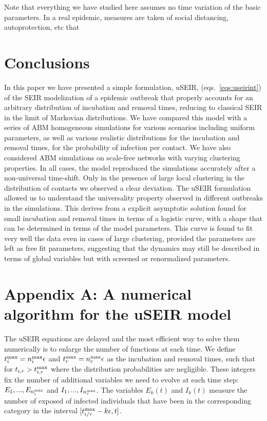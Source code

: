 \documentclass[a4paper,oneside,11pt]{article}
\begin{document}
Note that everything we have studied here assumes no time variation of the basic parameters. In a real epidemic, measures are taken of social distancing, autoprotection, etc that 

\section{Conclusions}
\label{sec:conclu}



In this paper we have presented a simple formulation, uSEIR,  (eqs.~\ref{eqs:useirint}) of the SEIR modelization of a epidemic outbreak that properly accounts for an arbitrary distribution of incubation and removal times, reducing to classical SEIR in the limit of Markovian distributions.  We have compared this model with a series of ABM homogeneous simulations for various scenarios including uniform parameters, as well as various realistic distributions for the incubation and removal times,  for the probability of infection per contact. We have also considered ABM simulations on scale-free networks with varying 
 clustering properties. In all cases, the model reproduced the simulations accurately after a non-universal time-shift. Only in the presence of large local clustering in the distribution of contacts we observed a clear deviation. The uSEIR formulation allowed
us to understand the universality property observed in different outbreaks in the simulations. This derives from a explicit asymptotic solution found for small incubation and removal times in terms of a logistic curve, with a shape that can be determined in terms of the model parameters. This curve is found to fit very well the data  even in cases of large clustering, provided the parameters are left as free fit parameters, suggesting that the dynamics may still be described in terms of global variables but with  screened or renormalized parameters. 

\section*{Appendix A: A numerical algorithm for the uSEIR model}
\label{sec:appendix}

The uSEIR equations are delayed and the most efficient way to solve them numerically is to enlarge the number of functions at each time. We define $t_i^{\rm max}=n_i^{\rm max} \epsilon$ and $t_r^{\rm max}=n_r^{\rm max} \epsilon$ as the incubation and removal times, such that for $t_{i,r}> t_{i,r}^{\rm max}$ where the distribution probabilities are negligible.
These integers fix the number of additional variables we need to evolve at each time step: $E_1,...,E_{n_i^{\rm max}}$ and $I_1,...,I_{n_r^{\rm max}}$. The variables $E_k(t)$ and $I_k(t)$ measure the number of exposed of infected individuals that have been in the corresponding category in the interval $[t_{i/r}^{\rm max}- k \epsilon,t]$.
\end{document}
